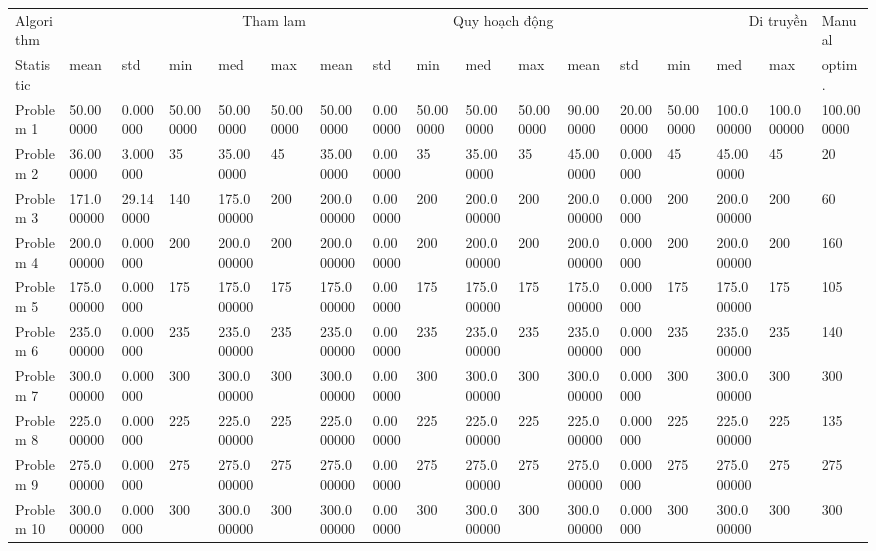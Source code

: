 \begin{tabular}{lllllllllllllllll}
\toprule
Algorithm & \multicolumn{5}{r}{Tham lam} & \multicolumn{5}{r}{Quy hoạch động} & \multicolumn{5}{r}{Di truyền} & Manual \\
Statistic & mean & std & min & med & max & mean & std & min & med & max & mean & std & min & med & max & optim. \\
\midrule
Problem 1 & 50.000000 & 0.000000 & 50.000000 & 50.000000 & 50.000000 & 50.000000 & 0.000000 & 50.000000 & 50.000000 & 50.000000 & 90.000000 & 20.000000 & 50.000000 & 100.000000 & 100.000000 & 100.000000 \\
Problem 2 & 36.000000 & 3.000000 & 35 & 35.000000 & 45 & 35.000000 & 0.000000 & 35 & 35.000000 & 35 & 45.000000 & 0.000000 & 45 & 45.000000 & 45 & 20 \\
Problem 3 & 171.000000 & 29.140000 & 140 & 175.000000 & 200 & 200.000000 & 0.000000 & 200 & 200.000000 & 200 & 200.000000 & 0.000000 & 200 & 200.000000 & 200 & 60 \\
Problem 4 & 200.000000 & 0.000000 & 200 & 200.000000 & 200 & 200.000000 & 0.000000 & 200 & 200.000000 & 200 & 200.000000 & 0.000000 & 200 & 200.000000 & 200 & 160 \\
Problem 5 & 175.000000 & 0.000000 & 175 & 175.000000 & 175 & 175.000000 & 0.000000 & 175 & 175.000000 & 175 & 175.000000 & 0.000000 & 175 & 175.000000 & 175 & 105 \\
Problem 6 & 235.000000 & 0.000000 & 235 & 235.000000 & 235 & 235.000000 & 0.000000 & 235 & 235.000000 & 235 & 235.000000 & 0.000000 & 235 & 235.000000 & 235 & 140 \\
Problem 7 & 300.000000 & 0.000000 & 300 & 300.000000 & 300 & 300.000000 & 0.000000 & 300 & 300.000000 & 300 & 300.000000 & 0.000000 & 300 & 300.000000 & 300 & 300 \\
Problem 8 & 225.000000 & 0.000000 & 225 & 225.000000 & 225 & 225.000000 & 0.000000 & 225 & 225.000000 & 225 & 225.000000 & 0.000000 & 225 & 225.000000 & 225 & 135 \\
Problem 9 & 275.000000 & 0.000000 & 275 & 275.000000 & 275 & 275.000000 & 0.000000 & 275 & 275.000000 & 275 & 275.000000 & 0.000000 & 275 & 275.000000 & 275 & 275 \\
Problem 10 & 300.000000 & 0.000000 & 300 & 300.000000 & 300 & 300.000000 & 0.000000 & 300 & 300.000000 & 300 & 300.000000 & 0.000000 & 300 & 300.000000 & 300 & 300 \\
\bottomrule
\end{tabular}
